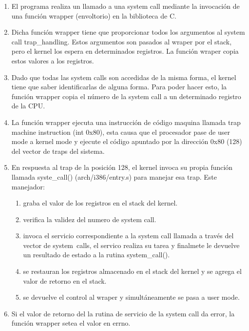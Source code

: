 \documentclass[../main.tex]{subfiles}
\begin{document}
            \begin{enumerate}
                \item El programa realiza un llamado a una system call mediante la invocación de una función wrapper (envoltorio) en la biblioteca de C.
                \item Dicha función wrapper tiene que proporcionar todos los argumentos al system call trap\_handling. Estos argumentos son pasados al wraper por el stack, pero el kernel los espera en determinados registros. La función wraper copia estos valores a los registros.
                \item Dado que todas las system calls son accedidas de la misma forma, el kernel tiene que saber identificarlas de alguna forma. Para poder hacer esto, la función wrapper copia el número de la system call a un determinado registro de la CPU. 
                \item La función wrapper ejecuta una instrucción de código maquina llamada trap machine instruction (int 0x80), esta causa que el procesador pase de user mode a kernel mode y ejecute el código apuntado por la dirección 0x80 (128) del vector de traps del sistema.
                \item En respuesta al trap de la posición 128, el kernel invoca su propia función llamada syste\_call() (arch/i386/entry.s) para manejar esa trap. Este manejador:
                      \begin{enumerate}
                        \item graba el valor de los registros en el stack del kernel.
                        \item verifica la validez del numero de system call.
                        \item invoca el servicio correspondiente a la system call llamada a través del vector de system\ calls, el servico realiza su tarea y finalmete le devuelve un resultado de estado a la rutina system\_call().
                        \item se restauran los registros almacenado en el stack del kernel y se agrega el valor de retorno en el stack.
                        \item se devuelve el control al wraper y simultáneamente se pasa a user mode.
                      \end{enumerate}
                \item Si el valor de retorno del la rutina de servicio de la system call da error, la función wrapper setea el valor en errno.
            \end{enumerate}
\end{document}

